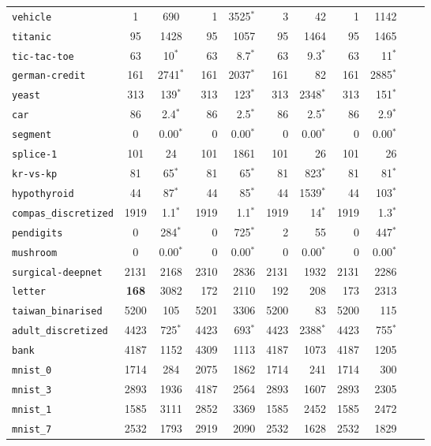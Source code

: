 \begin{tabular}{lccrrrrrrrr}
\texttt{vehicle} & 1 & 690 & 1 & 3525$^*$ & 3 & 42 & 1 & 1142\\
\texttt{titanic} & 95 & 1428 & 95 & 1057 & 95 & 1464 & 95 & 1465\\
\texttt{tic-tac-toe} & 63 & 10$^*$ & 63 & 8.7$^*$ & 63 & 9.3$^*$ & 63 & 11$^*$\\
\texttt{german-credit} & 161 & 2741$^*$ & 161 & 2037$^*$ & 161 & 82 & 161 & 2885$^*$\\
\texttt{yeast} & 313 & 139$^*$ & 313 & 123$^*$ & 313 & 2348$^*$ & 313 & 151$^*$\\
\texttt{car} & 86 & 2.4$^*$ & 86 & 2.5$^*$ & 86 & 2.5$^*$ & 86 & 2.9$^*$\\
\texttt{segment} & 0 & 0.00$^*$ & 0 & 0.00$^*$ & 0 & 0.00$^*$ & 0 & 0.00$^*$\\
\texttt{splice-1} & 101 & 24 & 101 & 1861 & 101 & 26 & 101 & 26\\
\texttt{kr-vs-kp} & 81 & 65$^*$ & 81 & 65$^*$ & 81 & 823$^*$ & 81 & 81$^*$\\
\texttt{hypothyroid} & 44 & 87$^*$ & 44 & 85$^*$ & 44 & 1539$^*$ & 44 & 103$^*$\\
\texttt{compas\_discretized} & 1919 & 1.1$^*$ & 1919 & 1.1$^*$ & 1919 & 14$^*$ & 1919 & 1.3$^*$\\
\texttt{pendigits} & 0 & 284$^*$ & 0 & 725$^*$ & 2 & 55 & 0 & 447$^*$\\
\texttt{mushroom} & 0 & 0.00$^*$ & 0 & 0.00$^*$ & 0 & 0.00$^*$ & 0 & 0.00$^*$\\
\texttt{surgical-deepnet} & 2131 & 2168 & 2310 & 2836 & 2131 & 1932 & 2131 & 2286\\
\texttt{letter} & \textbf{168} & 3082 & 172 & 2110 & 192 & 208 & 173 & 2313\\
\texttt{taiwan\_binarised} & 5200 & 105 & 5201 & 3306 & 5200 & 83 & 5200 & 115\\
\texttt{adult\_discretized} & 4423 & 725$^*$ & 4423 & 693$^*$ & 4423 & 2388$^*$ & 4423 & 755$^*$\\
\texttt{bank} & 4187 & 1152 & 4309 & 1113 & 4187 & 1073 & 4187 & 1205\\
\texttt{mnist\_0} & 1714 & 284 & 2075 & 1862 & 1714 & 241 & 1714 & 300\\
\texttt{mnist\_3} & 2893 & 1936 & 4187 & 2564 & 2893 & 1607 & 2893 & 2305\\
\texttt{mnist\_1} & 1585 & 3111 & 2852 & 3369 & 1585 & 2452 & 1585 & 2472\\
\texttt{mnist\_7} & 2532 & 1793 & 2919 & 2090 & 2532 & 1628 & 2532 & 1829\\

\end{tabular}
